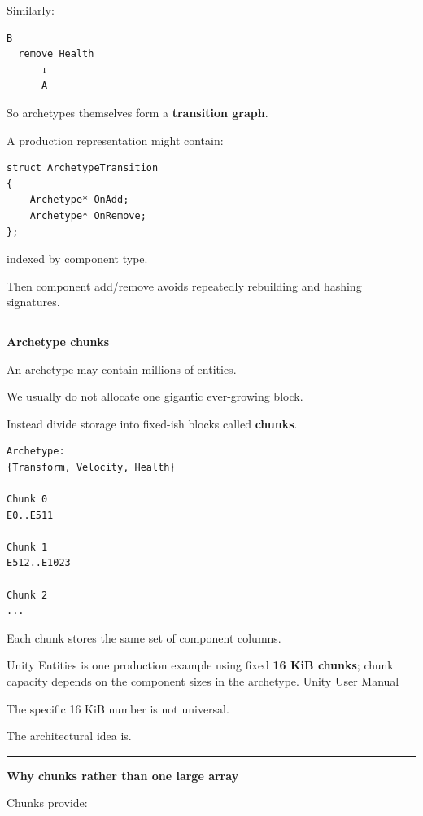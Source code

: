 Similarly:

\begin{verbatim}
B
  remove Health
      ↓
      A
\end{verbatim}

So archetypes themselves form a \textbf{transition graph}.

A production representation might contain:

\begin{verbatim}
struct ArchetypeTransition
{
    Archetype* OnAdd;
    Archetype* OnRemove;
};
\end{verbatim}

indexed by component type.

Then component add/remove avoids repeatedly rebuilding and hashing signatures.

\begin{center}\rule{0.5\linewidth}{0.5pt}\end{center}

\textbf{Archetype chunks}

An archetype may contain millions of entities.

We usually do not allocate one gigantic ever-growing block.

Instead divide storage into fixed-ish blocks called \textbf{chunks}.

\begin{verbatim}
Archetype:
{Transform, Velocity, Health}

Chunk 0
E0..E511

Chunk 1
E512..E1023

Chunk 2
...
\end{verbatim}

Each chunk stores the same set of component columns.

Unity Entities is one production example using fixed \textbf{16 KiB chunks}; chunk capacity depends on the component sizes in the archetype. \href{https://docs.unity.cn/Packages/com.unity.entities\%401.0/manual/concepts-archetypes.html?utm_source=chatgpt.com}{Unity User Manual}

The specific 16 KiB number is not universal.

The architectural idea is.

\begin{center}\rule{0.5\linewidth}{0.5pt}\end{center}

\textbf{Why chunks rather than one large array}

Chunks provide:

